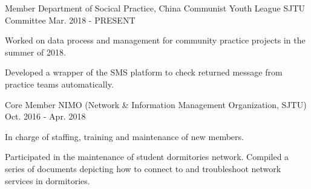 


\begin{cventries}


\cventry
{Member} %
{Department of Socical Practice, China Communist Youth League SJTU Committee} %
{} %
{Mar. 2018 - PRESENT} %
{ %
\begin{cvitems}
\item {Worked on data process and management for community practice projects in the summer of 2018.}
\item {Developed a wrapper of the SMS platform to check returned message from practice teams automatically.}
\end{cvitems}
}


\cventry
{Core Member} %
{NIMO (Network \& Information Management Organization, SJTU)} %
{} %
{Oct. 2016 - Apr. 2018} %
{ %
\begin{cvitems}
\item {In charge of staffing, training and maintenance of new members.}
\item {Participated in the maintenance of student dormitories network. Compiled a series of documents depicting how to connect to and troubleshoot network services in dormitories.}
\end{cvitems}
}


\end{cventries}